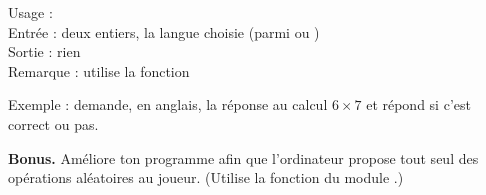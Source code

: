 \documentclass[11pt,class=report,crop=false]{standalone}
\begin{document}
\begin{activite}
\begin{enumerate}
\begin{enumerate}
\begin{fonction}
  Usage :  \\
  Entrée : deux entiers, la langue choisie (parmi  ou )\\
  Sortie : rien\\
  Remarque : utilise la fonction 
  
  \medskip
    
  Exemple :  demande, en anglais, la réponse au calcul $6 \times 7$ et répond si c'est correct ou pas.
  \end{fonction}     
    
  \end{enumerate}
  
  
  \textbf{Bonus.} Améliore ton programme afin que l'ordinateur propose tout seul des opérations aléatoires au joueur. (Utilise la fonction  du module .)
  
\end{enumerate}
\end{activite}




\end{document}
